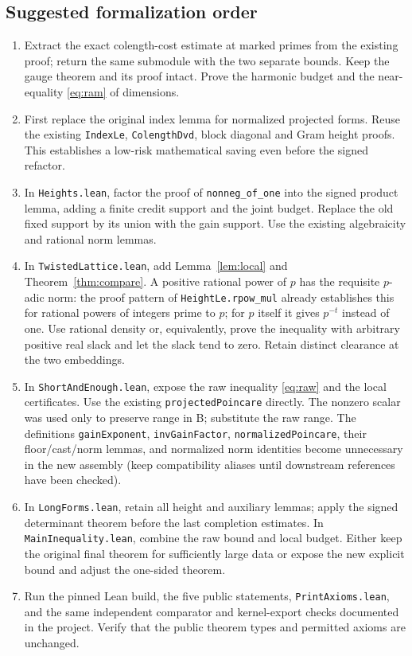 \documentclass[11pt,letterpaper]{article}
\theoremstyle{remark}\newtheorem{remark}[theorem]{Remark}
\begin{document}
\subsection{Suggested formalization order}
\begin{enumerate}
\item Extract the exact colength-cost estimate at marked primes from the existing proof; return the same submodule with the two separate bounds. Keep the gauge theorem and its proof intact. Prove the harmonic budget and the near-equality \eqref{eq:ram} of dimensions.
\item First replace the original index lemma for normalized projected forms. Reuse the existing \texttt{IndexLe}, \texttt{ColengthDvd}, block diagonal and Gram height proofs. This establishes a low-risk mathematical saving even before the signed refactor.
\item In \texttt{Heights.lean}, factor the proof of \texttt{nonneg\_of\_one} into the signed product lemma, adding a finite credit support and the joint budget. Replace the old fixed support by its union with the gain support. Use the existing algebraicity and rational norm lemmas.
\item In \texttt{TwistedLattice.lean}, add Lemma~\ref{lem:local} and Theorem~\ref{thm:compare}. A positive rational power of $p$ has the requisite $p$-adic norm: the proof pattern of \texttt{HeightLe.rpow\_mul} already establishes this for rational powers of integers prime to $p$; for $p$ itself it gives $p^{-t}$ instead of one. Use rational density or, equivalently, prove the inequality with arbitrary positive real slack and let the slack tend to zero. Retain distinct clearance at the two embeddings.
\item In \texttt{ShortAndEnough.lean}, expose the raw inequality \eqref{eq:raw} and the local certificates. Use the existing \texttt{projectedPoincare} directly. The nonzero scalar was used only to preserve range in B; substitute the raw range. The definitions \texttt{gainExponent}, \texttt{invGainFactor}, \texttt{normalizedPoincare}, their floor/cast/norm lemmas, and normalized norm identities become unnecessary in the new assembly (keep compatibility aliases until downstream references have been checked).
\item In \texttt{LongForms.lean}, retain all height and auxiliary lemmas; apply the signed determinant theorem before the last completion estimates. In \texttt{MainInequality.lean}, combine the raw bound and local budget. Either keep the original final theorem for sufficiently large data or expose the new explicit bound and adjust the one-sided theorem.
\item Run the pinned Lean build, the five public statements, \texttt{PrintAxioms.lean}, and the same independent comparator and kernel-export checks documented in the project. Verify that the public theorem types and permitted axioms are unchanged.
\end{enumerate}
\end{document}
